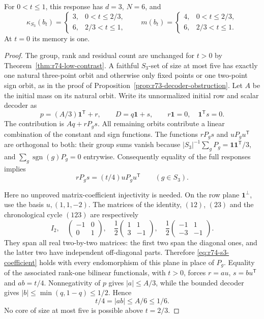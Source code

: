 \begin{proposition}
\label{prop:r74-s3-contrast}
For $0<t\le1$, this response has $d=3$, $N=6$, and
\[
 \kappa_{S_3}(b_t)=
 \begin{cases}3,&0<t\le2/3,\\6,&2/3<t\le1,\end{cases}
 \qquad
 m(b_t)=
 \begin{cases}4,&0<t\le2/3,\\6,&2/3<t\le1.\end{cases}
\]
At $t=0$ its memory is one.
\end{proposition}
\begin{proof}
The group, rank and residual count are unchanged for $t>0$ by
Theorem~\ref{thm:r74-low-contrast}. A faithful $S_3$-set of size at most
five has exactly one natural three-point orbit and otherwise only fixed
points or one two-point sign orbit, as in the proof of
Proposition~\ref{prop:r73-decoder-obstruction}. Let $A$ be the initial
mass on its natural orbit. Write its unnormalized initial row and scalar
decoder as
\[
 p=(A/3)\mathbf1^{\mathsf T}+r,
 \qquad D=q\mathbf1+s,
 \qquad r\mathbf1=0,\quad\mathbf1^{\mathsf T}s=0.
\]
The contribution is $Aq+rP_gs$. All remaining orbits contribute a linear
combination of the constant and sign functions. The functions $rP_gs$ and
$uP_gu^{\mathsf T}$ are orthogonal to both: their group sums vanish because
$|S_3|^{-1}\sum_gP_g=\mathbf1\mathbf1^{\mathsf T}/3$, and
$\sum_g\operatorname{sgn}(g)P_g=0$ entrywise. Consequently equality of the
full responses implies
\begin{equation}\label{eq:r74-s3-coefficient}
 rP_gs=(t/4)uP_gu^{\mathsf T}\qquad(g\in S_3).
\end{equation}

Here no unproved matrix-coefficient injectivity is needed. On the row plane
$\mathbf1^\perp$, use the basis $u,(1,1,-2)$. The matrices of the identity,
$(12)$, $(23)$ and the chronological cycle $(123)$ are respectively
\[
 I_2,\quad
 \begin{pmatrix}-1&0\\0&1\end{pmatrix},\quad
 \frac12\begin{pmatrix}1&1\\3&-1\end{pmatrix},\quad
 \frac12\begin{pmatrix}-1&1\\-3&-1\end{pmatrix}.
\]
They span all real two-by-two matrices: the first two span the diagonal
ones, and the latter two have independent off-diagonal parts. Therefore
\eqref{eq:r74-s3-coefficient} holds with every endomorphism of this plane
in place of $P_g$. Equality of the associated rank-one bilinear functionals,
with $t>0$, forces $r=au$, $s=bu^{\mathsf T}$ and $ab=t/4$.
Nonnegativity of $p$ gives $|a|\le A/3$, while the bounded decoder gives
$|b|\le\min(q,1-q)\le1/2$. Hence
\[
 t/4=|ab|\le A/6\le1/6.
\]
No core of size at most five is possible above $t=2/3$.


\end{proof}
